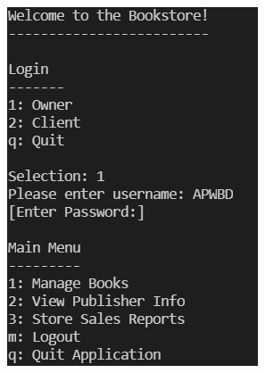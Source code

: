 \documentclass[Project Report]{article}
\begin{document}
{\centering \includegraphics[width=\textwidth]{../Screenshots/Owner_login_main_menu.PNG}}
\end{document}
